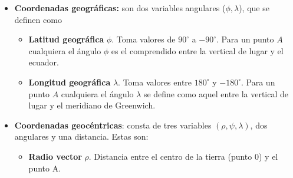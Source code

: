 \begin{itemize}
	\item \textbf{Coordenadas geográficas:} son dos variables angulares ($\phi,\lambda$), que se definen como

	\begin{itemize}	
		\item \textbf{Latitud geográfica} $\phi$. Toma valores de $90^\circ$ a $-90^\circ$. Para un punto $A$ cualquiera el ángulo $\phi$ es el comprendido entre la vertical de lugar y el ecuador.
		\item \textbf{Longitud geográfica} $\lambda$. Toma valores entre $180^\circ$ y $-180^\circ$. Para un punto $A$ cualquiera el ángulo $\lambda$ se define como aquel entre la vertical de lugar y el meridiano de Greenwich. 
	\end{itemize}
	
	\item \textbf{Coordenadas geocéntricas}: consta de tres variables $(\rho,\psi,\lambda)$, dos angulares y una distancia. Estas son: 
	
	\vspace{2mm}
		
	\begin{minipage}{1\textwidth}
	 \begin{itemize}
	\item \textbf{Radio vector} $\rho$. Distancia entre el centro de la tierra (punto 0) y el punto A. 
	\end{itemize}
	\end{minipage}	


\end{itemize}
